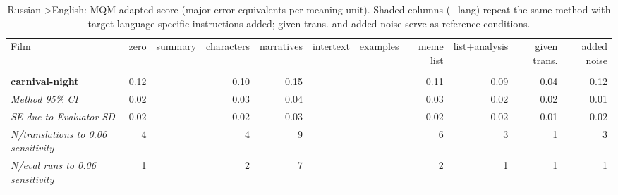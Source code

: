 \begin{table}[ht]
\centering
\begin{adjustbox}{width=\textwidth}
\begin{tabular}{lrrrrrrrr|rr}
Film & zero & summary & characters & narratives & intertext & examples & meme list & list+analysis & \multicolumn{1}{|r}{given trans.} & added noise \\
 &  &  &  &  &  &  &  &  &  &  \\
\hline
\textbf{carnival-night} & 0.12 &  & 0.10 & 0.15 &  &  & 0.11 & 0.09 & 0.04 & 0.12 \\

\emph{Method 95\% CI} & 0.02 &  & 0.03 & 0.04 &  &  & 0.03 & 0.02 & 0.02 & 0.01 \\

\emph{SE due to Evaluator SD} & 0.02 &  & 0.02 & 0.03 &  &  & 0.02 & 0.02 & 0.01 & 0.02 \\

\emph{N/translations to 0.06 sensitivity} & 4 &  & 4 & 9 &  &  & 6 & 3 & 1 & 3 \\

\emph{N/eval runs to 0.06 sensitivity} & 1 &  & 2 & 7 &  &  & 2 & 1 & 1 & 1 \\

\hline
\end{tabular}
\end{adjustbox}
\caption{Russian->English: MQM adapted score (major-error equivalents per meaning unit). Shaded columns (+lang) repeat the same method with target-language-specific instructions added; given trans. and added noise serve as reference conditions.}
\label{tab:mqm-method-comparison}
\end{table}
